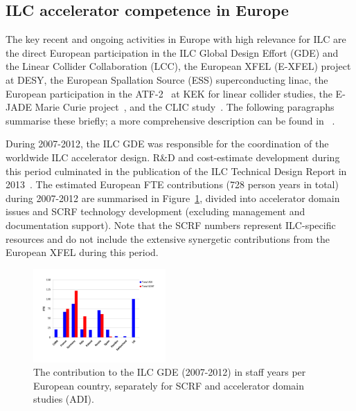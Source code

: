 \documentclass[%
 reprint,
 floatfix,
 amsmath,amssymb,
 aps,
]{revtex4-1}
\begin{document}
\subsection{ILC accelerator competence in Europe~\label{sec:acc:competence}}

The key recent and ongoing activities in Europe with high relevance for ILC are the direct European participation in the ILC Global Design Effort (GDE) and the Linear Collider Collaboration (LCC),
the European XFEL (E-XFEL) project at DESY, the European Spallation Source (ESS) superconducting linac, the European 
participation in the ATF-2~\cite{Grishanov:2005ek,Grishanov:2006kx} at KEK for linear collider studies, the E-JADE Marie 
Curie project~\cite{ejade}, and the CLIC study~\cite{Aicheler:2012bya,Linssen:2012hp}. The following paragraphs 
summarise these briefly; a more comprehensive description can be found in ~\cite{ejade-report}. 

During 2007-2012, the ILC GDE was responsible for the coordination of the worldwide ILC accelerator design. 
R\&D and cost-estimate development during this period culminated in the publication of the ILC Technical Design Report in 2013~\cite{Behnke:2013xla}. 
The estimated European FTE contributions (728 person years in total) during 2007-2012 are summarised in Figure~\ref{fig:PrePrep:ilcgde4}, 
divided into accelerator domain issues and SCRF technology development (excluding management and documentation support). 
Note that the SCRF numbers represent ILC-specific resources and do not include the extensive synergetic contributions from the European XFEL during this period.

\begin{figure}[htbp]
\includegraphics[width=0.45\textwidth]{figures/EU-GDE-FTE-columns-per-country.pdf}
\caption{\label{fig:PrePrep:ilcgde4} The contribution to the ILC GDE (2007-2012) in staff years per European country, separately for SCRF and accelerator domain studies (ADI).}
\end{figure}

\end{document}
